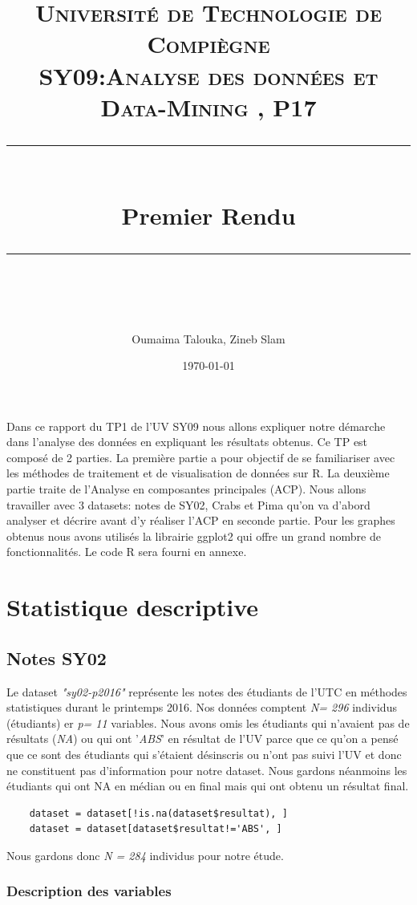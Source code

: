 \documentclass[10pt]{article}
\title{
	\normalfont \normalsize 
	\textsc{Université de Technologie de Compiègne\\ 
		SY09:Analyse des données et Data-Mining , P17} \\
	[10pt] 
	\rule{\linewidth}{0.5pt} \\[6pt] 
	\huge Premier Rendu \\
	\rule{\linewidth}{2pt}  \\[10pt]
}
\author{Oumaima Talouka, Zineb Slam}
\date{\normalsize \today}
\begin{document}
	
	{\let\newpage\relax\maketitle}
	
	Dans ce rapport du TP1 de l'UV SY09 nous allons expliquer notre démarche dans l'analyse des données en expliquant les résultats obtenus. Ce TP est composé de 2 parties. La première partie a pour objectif de se familiariser avec les méthodes de traitement et de visualisation de données sur R. La deuxième partie traite de l'Analyse en composantes principales (ACP). Nous allons travailler avec 3 datasets: notes de SY02, Crabs et Pima qu'on va d'abord analyser et décrire avant d'y réaliser l'ACP en seconde partie. Pour les graphes obtenus nous avons utilisés la librairie ggplot2 qui offre un grand nombre de fonctionnalités. Le code R sera fourni en annexe.
	
	
	
	
	\section{ Statistique descriptive}
	
	\subsection{Notes SY02}
	Le dataset \textit{"sy02-p2016"} représente les notes des étudiants de l'UTC en méthodes statistiques durant le printemps 2016. Nos données comptent \textit{N= 296} individus (étudiants) er \textit{p= 11} variables. Nous avons omis  les étudiants qui n'avaient pas de résultats (\textit{NA}) ou qui ont '\textit{ABS}' en résultat de l'UV parce que ce qu'on a pensé que ce sont des étudiants qui s'étaient désinscris ou n'ont pas suivi l'UV et donc ne constituent pas d'information pour notre dataset. Nous gardons néanmoins les étudiants qui ont NA en médian ou en final mais qui ont obtenu un résultat final. 
	
	\begin{lstlisting}
	dataset = dataset[!is.na(dataset$resultat), ]
	dataset = dataset[dataset$resultat!='ABS', ]
	\end{lstlisting}
	
	Nous gardons donc \textit{N = 284} individus pour notre étude.
	
	\subsubsection{Description des variables}
	
\end{document}
